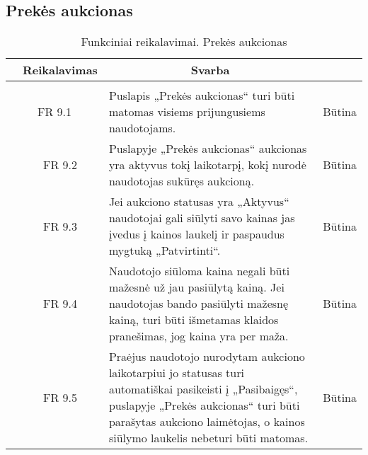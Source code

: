 \documentclass{VUMIFPSkursinis}
\begin{document}
\subsection{Prekės aukcionas}
\begin{table}[H]
	\caption{Funkciniai reikalavimai. Prekės aukcionas}
	\begin{tabular}{|p{1cm}|p{1cm}|p{}|p{}|}
		\hline 
		\rowcolor{gray!50}
		\multicolumn{2}{|c|}{{\bfseries Kodas}}&
		\multicolumn{1}{c|}{{\bfseries Reikalavimas}}&
		\multicolumn{1}{c|}{{\bfseries Svarba}}\\
		\hline
		\rowcolor{lightgray}
		\multicolumn{4}{|c|}{Prekės aukcionas}\\				
		\hline
		\multicolumn{2}{|c|}{FR 9.1}&
		{Puslapis „Prekės aukcionas“ turi būti matomas visiems prijungusiems naudotojams.
		}&		
		\multicolumn{1}{c|}{Būtina}\\
		\hline
		\multicolumn{1}{|c}{}&
		\multicolumn{1}{c|}{FR 9.2}&
		{Puslapyje „Prekės aukcionas“ aukcionas yra aktyvus tokį laikotarpį, kokį nurodė naudotojas sukūręs aukcioną.
		}&		
		\multicolumn{1}{c|}{Būtina}\\
		\hline	
		\multicolumn{1}{|c}{}&
		\multicolumn{1}{c|}{FR 9.3}&
		{Jei aukciono statusas yra „Aktyvus“ naudotojai gali siūlyti savo kainas jas įvedus į kainos laukelį ir paspaudus mygtuką „Patvirtinti“.
		}&
		\multicolumn{1}{c|}{Būtina}\\									
		\hline
		\multicolumn{1}{|c}{}&
		\multicolumn{1}{c|}{FR 9.4}&
		{Naudotojo siūloma kaina negali būti mažesnė už jau pasiūlytą kainą. Jei naudotojas bando pasiūlyti mažesnę kainą, turi būti išmetamas klaidos pranešimas, jog kaina yra per maža.
		}&
		\multicolumn{1}{c|}{Būtina}\\									
		\hline
		\multicolumn{1}{|c}{}&
		\multicolumn{1}{c|}{FR 9.5}&
		{Praėjus naudotojo nurodytam aukciono laikotarpiui jo statusas turi automatiškai pasikeisti į „Pasibaigęs“, puslapyje „Prekės aukcionas“ turi būti parašytas aukciono laimėtojas, o kainos siūlymo laukelis nebeturi būti matomas.
		}&
		\multicolumn{1}{c|}{Būtina}\\									
		\hline
	\end{tabular}		
\end{table}
\end{document}
